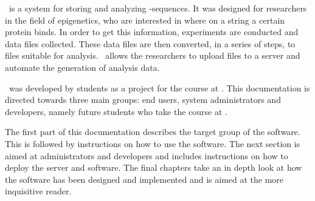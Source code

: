 

\appName\ is a system for storing and analyzing -sequences. It was designed for researchers in the field of epigenetics, who are interested in where on a  string a certain protein binds. In order to get this information, experiments are conducted and  data files collected. These data files are then converted, in a series of steps, to files suitable for analysis. \appName\ allows the researchers to upload  files to a server and automate the generation of analysis data. 

\appName\ was developed by students as a project for the course  at . This documentation is directed towards three main groups: end users, system administrators and developers, namely future students who take the course  at .

The first part of this documentation describes the target group of the software. This is followed by instructions on how to use the software. The next section is aimed at administrators and developers and includes instructions on how to deploy the server and software. The final chapters take an in depth look at how the software has been designed and implemented and is aimed at the more inquisitive reader.

